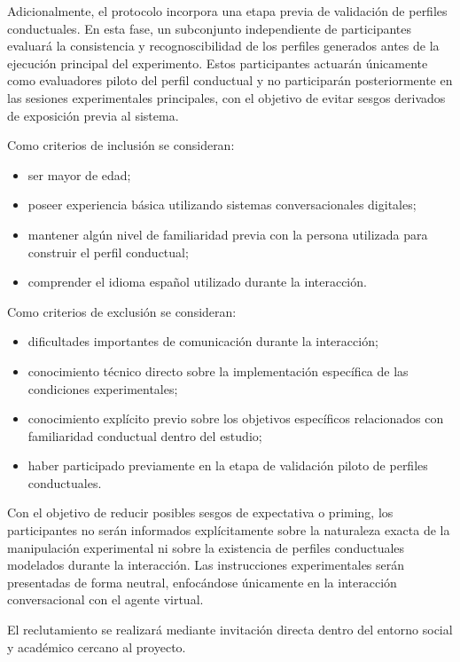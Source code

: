 \documentclass[12pt]{article}
\begin{document}
Adicionalmente, el protocolo incorpora una etapa previa de validación de perfiles conductuales. En esta fase, un subconjunto independiente de participantes evaluará la consistencia y recognoscibilidad de los perfiles generados antes de la ejecución principal del experimento. Estos participantes actuarán únicamente como evaluadores piloto del perfil conductual y no participarán posteriormente en las sesiones experimentales principales, con el objetivo de evitar sesgos derivados de exposición previa al sistema.

Como criterios de inclusión se consideran:

\begin{itemize}
    \item ser mayor de edad;
    \item poseer experiencia básica utilizando sistemas conversacionales digitales;
    \item mantener algún nivel de familiaridad previa con la persona utilizada para construir el perfil conductual;
    \item comprender el idioma español utilizado durante la interacción.
\end{itemize}

Como criterios de exclusión se consideran:

\begin{itemize}
    \item dificultades importantes de comunicación durante la interacción;
    \item conocimiento técnico directo sobre la implementación específica de las condiciones experimentales;
    \item conocimiento explícito previo sobre los objetivos específicos relacionados con familiaridad conductual dentro del estudio;
    \item haber participado previamente en la etapa de validación piloto de perfiles conductuales.
\end{itemize}

Con el objetivo de reducir posibles sesgos de expectativa o priming, los participantes no serán informados explícitamente sobre la naturaleza exacta de la manipulación experimental ni sobre la existencia de perfiles conductuales modelados durante la interacción. Las instrucciones experimentales serán presentadas de forma neutral, enfocándose únicamente en la interacción conversacional con el agente virtual.

El reclutamiento se realizará mediante invitación directa dentro del entorno social y académico cercano al proyecto.
\end{document}
